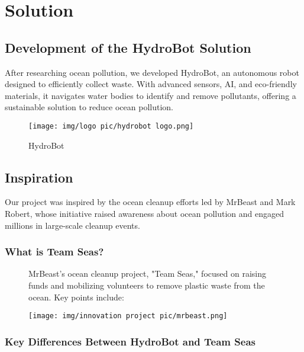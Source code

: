 \section{Solution}

\subsection{Development of the HydroBot Solution}
After researching ocean pollution, we developed HydroBot, an autonomous robot designed to efficiently collect waste. With advanced sensors, AI, and eco-friendly materials, it navigates water bodies to identify and remove pollutants, offering a sustainable solution to reduce ocean pollution.

\begin{figure}[h]
\centering
\texttt{[image: img/logo pic/hydrobot logo.png]} 
\caption{HydroBot}
\end{figure}


\subsection{ {Inspiration}}
Our project was inspired by the ocean cleanup efforts led by MrBeast and Mark Robert, whose initiative raised awareness about ocean pollution and engaged millions in large-scale cleanup events.





\subsubsection{{What is Team Seas?}}
\begin{figure}[h!]
    \begin{minipage}{0.6\textwidth}
       MrBeast’s ocean cleanup project, "Team Seas," focused on raising funds and mobilizing volunteers to remove plastic waste from the ocean. Key points include:
    \end{minipage}
    \hfill
    \begin{minipage}{0.35\textwidth}
        \texttt{[image: img/innovation project pic/mrbeast.png]} 
    \end{minipage}
\end{figure}



\subsubsection{{Key Differences Between HydroBot and Team Seas}}

